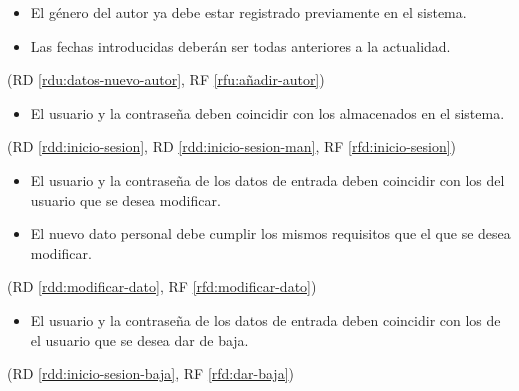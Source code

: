 \begin{itemize}
  \item El género del autor ya debe estar registrado previamente en el sistema.
  \item Las fechas introducidas deberán ser todas anteriores a la actualidad.
\end{itemize}
(RD \ref{rdu:datos-nuevo-autor}, RF \ref{rfu:añadir-autor})

%

\begin{itemize}
\item El usuario y la contraseña deben coincidir con los almacenados en el sistema.
\end{itemize}
(RD \ref{rdd:inicio-sesion}, RD \ref{rdd:inicio-sesion-man}, RF \ref{rfd:inicio-sesion})

\begin{itemize}
\item El usuario y la contraseña de los datos de entrada deben coincidir con los del usuario que se desea modificar.
\item El nuevo dato personal debe cumplir los mismos requisitos que el que se desea modificar.
\end{itemize}
(RD \ref{rdd:modificar-dato}, RF \ref{rfd:modificar-dato})

\begin{itemize}
\item El usuario y la contraseña de los datos de entrada deben coincidir con los de el usuario que se desea dar de baja.
\end{itemize}
(RD \ref{rdd:inicio-sesion-baja}, RF \ref{rfd:dar-baja})

